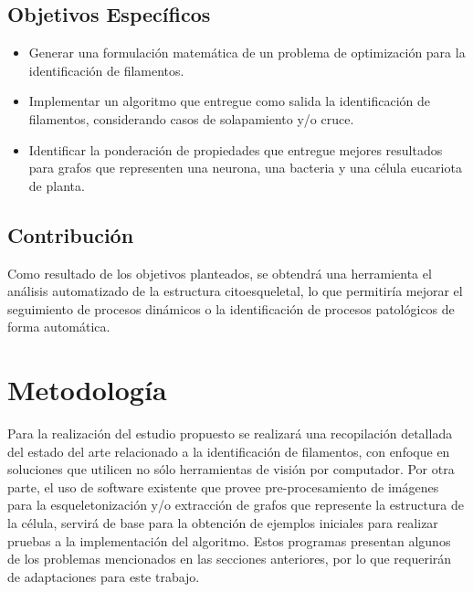 \documentclass{article}
\begin{document}
\subsection{Objetivos Espec\'ificos}
\begin{itemize}
    \item Generar una formulaci\'on matem\'atica de un problema de optimizaci\'on para la identificaci\'on de filamentos. 
    \item Implementar un algoritmo que entregue como salida la identificaci\'on de filamentos, considerando casos de solapamiento y/o cruce.
    \item Identificar la ponderaci\'on de propiedades que entregue mejores resultados para grafos que representen una neurona, una bacteria y una c\'elula eucariota de planta. 
    
\end{itemize}

\subsection{Contribuci\'on}

Como resultado de los objetivos planteados, se obtendr\'a una herramienta el an\'alisis automatizado de la estructura citoesqueletal, lo que permitir\'ia mejorar el seguimiento de procesos din\'amicos o la identificaci\'on de procesos patol\'ogicos de forma autom\'atica.

\section{Metodolog\'ia}

Para la realizaci\'on del estudio propuesto se realizar\'a una recopilaci\'on detallada del estado del arte relacionado a la identificaci\'on de filamentos, con enfoque en soluciones que utilicen no s\'olo herramientas de visi\'on por computador.
Por otra parte, el uso de software existente que provee pre-procesamiento de im\'agenes para la esqueletonizaci\'on y/o extracción de grafos que represente la estructura de la c\'elula, servir\'a de base para la obtenci\'on de ejemplos iniciales para realizar pruebas a la implementaci\'on del algoritmo. Estos programas presentan algunos de los problemas mencionados en las secciones anteriores, por lo que requerir\'an de adaptaciones para este trabajo.  
\end{document}
